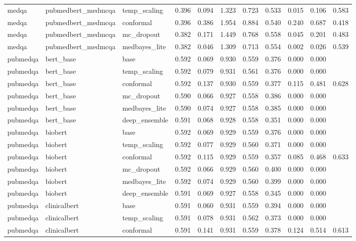\begin{table}[htbp]
\begin{tabular}{lllllllllll}
medqa & pubmedbert\_medmcqa & temp\_scaling & 0.396 & 0.094 & 1.323 & 0.723 & 0.533 & 0.015 & 0.106 & 0.583 \\
medqa & pubmedbert\_medmcqa & conformal & 0.396 & 0.386 & 1.954 & 0.884 & 0.540 & 0.240 & 0.687 & 0.418 \\
medqa & pubmedbert\_medmcqa & mc\_dropout & 0.382 & 0.171 & 1.449 & 0.768 & 0.558 & 0.045 & 0.201 & 0.483 \\
medqa & pubmedbert\_medmcqa & medbayes\_lite & 0.382 & 0.046 & 1.309 & 0.713 & 0.554 & 0.002 & 0.026 & 0.539 \\
pubmedqa & bert\_base & base & 0.592 & 0.069 & 0.930 & 0.559 & 0.376 & 0.000 & 0.000 &  \\
pubmedqa & bert\_base & temp\_scaling & 0.592 & 0.079 & 0.931 & 0.561 & 0.376 & 0.000 & 0.000 &  \\
pubmedqa & bert\_base & conformal & 0.592 & 0.137 & 0.930 & 0.559 & 0.377 & 0.115 & 0.481 & 0.628 \\
pubmedqa & bert\_base & mc\_dropout & 0.590 & 0.066 & 0.927 & 0.558 & 0.386 & 0.000 & 0.000 &  \\
pubmedqa & bert\_base & medbayes\_lite & 0.590 & 0.074 & 0.927 & 0.558 & 0.385 & 0.000 & 0.000 &  \\
pubmedqa & bert\_base & deep\_ensemble & 0.591 & 0.068 & 0.928 & 0.558 & 0.351 & 0.000 & 0.000 &  \\
pubmedqa & biobert & base & 0.592 & 0.069 & 0.929 & 0.559 & 0.376 & 0.000 & 0.000 &  \\
pubmedqa & biobert & temp\_scaling & 0.592 & 0.077 & 0.929 & 0.560 & 0.371 & 0.000 & 0.000 &  \\
pubmedqa & biobert & conformal & 0.592 & 0.115 & 0.929 & 0.559 & 0.357 & 0.085 & 0.468 & 0.633 \\
pubmedqa & biobert & mc\_dropout & 0.592 & 0.066 & 0.929 & 0.560 & 0.400 & 0.000 & 0.000 &  \\
pubmedqa & biobert & medbayes\_lite & 0.592 & 0.074 & 0.929 & 0.560 & 0.399 & 0.000 & 0.000 &  \\
pubmedqa & biobert & deep\_ensemble & 0.591 & 0.069 & 0.927 & 0.558 & 0.345 & 0.000 & 0.000 &  \\
pubmedqa & clinicalbert & base & 0.591 & 0.060 & 0.931 & 0.559 & 0.394 & 0.000 & 0.000 &  \\
pubmedqa & clinicalbert & temp\_scaling & 0.591 & 0.078 & 0.931 & 0.562 & 0.373 & 0.000 & 0.000 &  \\
pubmedqa & clinicalbert & conformal & 0.591 & 0.141 & 0.931 & 0.559 & 0.378 & 0.124 & 0.514 & 0.613 \\

\end{tabular}
\end{table}
